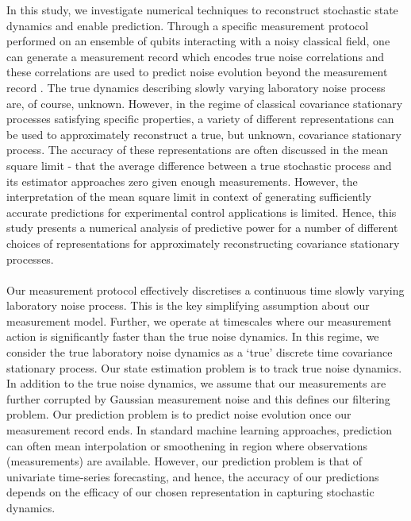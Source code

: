 
In this study, we investigate numerical techniques to reconstruct stochastic state dynamics and enable prediction. Through a specific measurement protocol performed on an ensemble of qubits interacting with a noisy classical field, one can generate a measurement record which encodes true noise correlations and these correlations are used to predict noise evolution beyond the measurement record \cite{mavadia2017}. The true dynamics describing slowly varying laboratory noise process are, of course, unknown. However, in the regime of classical covariance stationary processes satisfying specific properties, a variety of different representations can be used to approximately reconstruct a true, but unknown, covariance stationary process. The accuracy of these representations are often discussed in the mean square limit - that the average difference between a true stochastic process and its estimator approaches zero given enough measurements. However, the interpretation of the mean square limit in context of generating sufficiently accurate predictions for experimental control applications is limited. Hence, this study presents a numerical analysis of predictive power for a number of different choices of representations for approximately reconstructing covariance stationary processes. 
\\
\\
Our measurement protocol effectively discretises a continuous time slowly varying laboratory noise process. This is the key simplifying assumption about our measurement model. Further, we operate at timescales where our measurement action is significantly faster than the true noise dynamics. In this regime, we consider the true laboratory noise dynamics as a `true' discrete time covariance stationary process. Our state estimation problem is to track true noise dynamics. In addition to the true noise dynamics, we assume that our measurements are further corrupted by Gaussian measurement noise and this defines our filtering problem. Our prediction problem is to predict noise evolution once our measurement record ends. In standard machine learning approaches, prediction can often mean interpolation or smoothening in region where observations (measurements) are available. However, our prediction problem is that of univariate time-series forecasting, and hence, the accuracy of our predictions depends on the efficacy of our chosen representation in capturing stochastic dynamics. 
\\
\\
